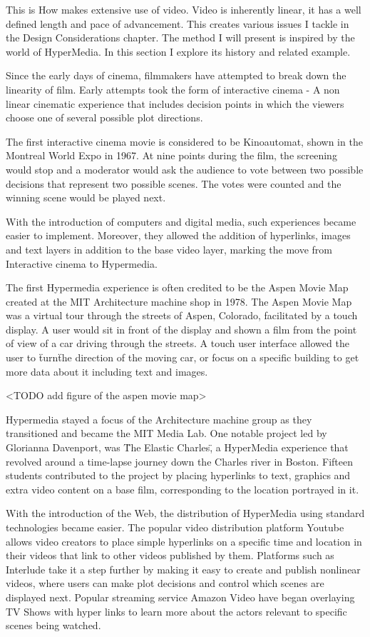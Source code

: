 This is How makes extensive use of video. Video is inherently linear, it has a well defined length and pace of advancement. This creates various issues I tackle in the Design Considerations chapter. The method I will present is inspired by the world of HyperMedia. In this section I explore its history and related example.

Since the early days of cinema, filmmakers have attempted to break down the linearity of film. Early attempts took the form of interactive cinema - A non linear cinematic experience that includes decision points in which the viewers choose one of several possible plot directions.

The first interactive cinema movie is considered to be Kinoautomat\cite{cincera1967kinoautomat}, shown in the Montreal World Expo in 1967. At nine points during the film, the screening would stop and a moderator would ask the audience to vote between two possible decisions that represent two possible scenes. The votes were counted and the winning scene would be played next.    

With the introduction of computers and digital media, such experiences became easier to implement. Moreover, they allowed the addition of hyperlinks, images and text layers in addition to the base video layer, marking the move from Interactive cinema to Hypermedia.  

The first Hypermedia experience is often credited to be the Aspen Movie Map\cite{lippman1978aspen} created at the MIT Architecture machine shop in 1978. The Aspen Movie Map was a virtual tour through the streets of Aspen, Colorado, facilitated by a touch display. A user would sit in front of the display and shown a film from the point of view of a car driving through the streets. A touch user interface allowed the user to \"turn\" the direction of the moving car, or focus on a specific building to get more data about it including text and images. 

<TODO add figure of the aspen movie map> 

Hypermedia stayed a focus of the Architecture machine group as they transitioned and became the MIT Media Lab. One notable project led by Glorianna Davenport, was \"The Elastic Charles\", a HyperMedia experience that revolved around a time-lapse journey down the Charles river in Boston. Fifteen students contributed to the project by placing hyperlinks to text, graphics and extra video content on a base film, corresponding to the location portrayed in it. 

With the introduction of the Web, the distribution of HyperMedia using standard technologies became easier. The popular video distribution platform Youtube\cite{youtube} allows video creators to place simple hyperlinks on a specific time and location in their videos that link to other videos published by them. Platforms such as Interlude\cite{interlude} take it a step further by making it easy to create and publish nonlinear videos, where users can make plot decisions and control which scenes are displayed next. Popular streaming service Amazon Video \cite{amazonvideo} have began overlaying TV Shows with hyper links to learn more about the actors relevant to specific scenes being watched. 

